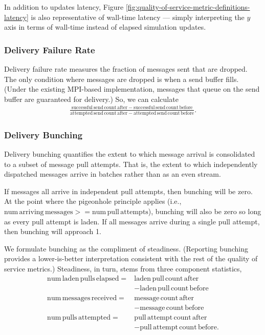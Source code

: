 In addition to updates latency, Figure \ref{fig:quality-of-service-metric-definitions-latency} is also representative of wall-time latency --- simply interpreting the $y$ axis in terms of wall-time instead of elapsed simulation updates.

\subsubsection{Delivery Failure Rate} \label{sec:delivery-failure-rate-metric}

Delivery failure rate measures the fraction of messages sent that are dropped.
The only condition where messages are dropped is when a send buffer fills.
(Under the existing MPI-based implementation, messages that queue on the send buffer are guaranteed for delivery.)
So, we can calculate
\begin{align*}
  \frac{
    \mathrm{successful\,send\,count\,after} - \mathrm{successful\,send\,count\,before}
  }{
    \mathrm{attempted\,send\,count\,after} - \mathrm{attempted\,send\,count\,before}
  }.
\end{align*}

\subsubsection{Delivery Bunching} \label{sec:delivery-clumpiness-metric}

Delivery bunching quantifies the extent to which message arrival is consolidated to a subset of message pull attempts.
That is, the extent to which independently dispatched messages arrive in batches rather than as an even stream.

If messages all arrive in independent pull attempts, then bunching will be zero.
At the point where the pigeonhole principle applies (i.e., $\mathrm{num\,arriving\,messages} >= \mathrm{num\,pull\,attempts}$), bunching will also be zero so long as every pull attempt is laden.
If all messages arrive during a single pull attempt, then bunching will approach 1.

We formulate bunching as the compliment of steadiness.
(Reporting bunching provides a lower-is-better interpretation consistent with the rest of the quality of service metrics.)
Steadiness, in turn, stems from three component statistics,
\begin{align*}
\mathrm{num\,laden\,pulls\,elapsed} =& \mathrm{laden\,pull\,count\,after} \\
  &- \mathrm{laden\,pull\,count\,before} \\
\mathrm{num\,messages\,received} =& \mathrm{message\,count\,after} \\
  &- \mathrm{message\,count\,before} \\
\mathrm{num\,pulls\,attempted} =& \mathrm{pull\,attempt\,count\,after} \\
  &- \mathrm{pull\,attempt\,count\,before}
.
\end{align*}

